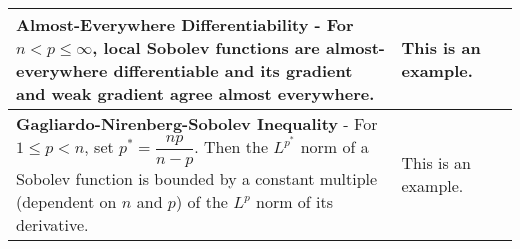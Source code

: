 \begin{longtable}{|*{3}{>{\centering\arraybackslash}p{}|}}
            \textbf{Almost-Everywhere Differentiability} - For $n < p \leq \infty$, local Sobolev functions are almost-everywhere differentiable and its gradient and weak gradient agree almost everywhere. & This is an example. \\[6pt] \hline
            
            \textbf{Gagliardo-Nirenberg-Sobolev Inequality} - For $1 \leq p < n$, set $p^* = \dfrac{np}{n - p}$.  Then the $L^{p^*}$ norm of a Sobolev function is bounded by a constant multiple (dependent on $n$ and $p$) of the $L^p$ norm of its derivative. \newline {$\!\begin{gathered} \norm{u}_{L^{p^*}(\Rl^n)} \leq C\norm{Du}_{L^p(\Rl^n)} \end{gathered}$} & This is an example. \\[6pt] \hline
            

    \bottomrule
\end{longtable}